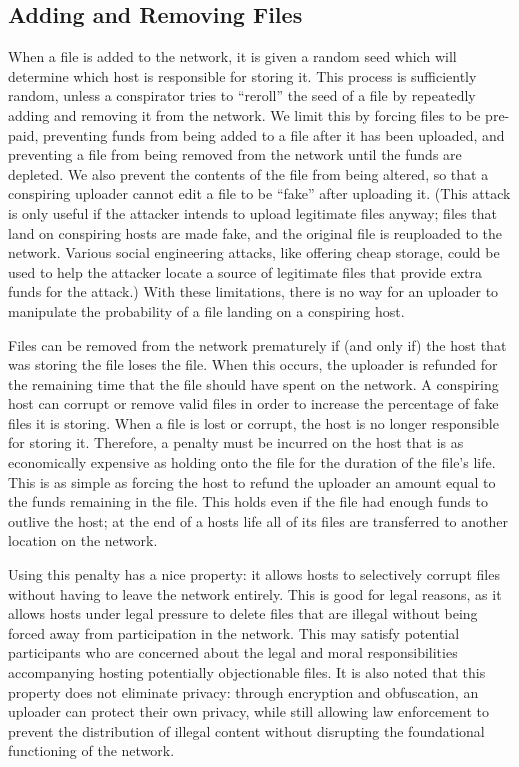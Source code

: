 \documentclass[twocolumn]{article}
\begin{document}
\subsection{Adding and Removing Files}
When a file is added to the network, it is given a random seed which will determine which host is responsible for storing it.
This process is sufficiently random, unless a conspirator tries to ``reroll'' the seed of a file by repeatedly adding and removing it from the network.
We limit this by forcing files to be pre-paid, preventing funds from being added to a file after it has been uploaded, and preventing a file from being removed from the network until the funds are depleted.
We also prevent the contents of the file from being altered, so that a conspiring uploader cannot edit a file to be ``fake'' after uploading it.
(This attack is only useful if the attacker intends to upload legitimate files anyway; files that land on conspiring hosts are made fake, and the original file is reuploaded to the network. Various social engineering attacks, like offering cheap storage, could be used to help the attacker locate a source of legitimate files that provide extra funds for the attack.)
With these limitations, there is no way for an uploader to manipulate the probability of a file landing on a conspiring host.

Files can be removed from the network prematurely if (and only if) the host that was storing the file loses the file.
When this occurs, the uploader is refunded for the remaining time that the file should have spent on the network.
A conspiring host can corrupt or remove valid files in order to increase the percentage of fake files it is storing.
When a file is lost or corrupt, the host is no longer responsible for storing it.
Therefore, a penalty must be incurred on the host that is as economically expensive as holding onto the file for the duration of the file's life.
This is as simple as forcing the host to refund the uploader an amount equal to the funds remaining in the file.
This holds even if the file had enough funds to outlive the host; at the end of a hosts life all of its files are transferred to another location on the network.

Using this penalty has a nice property: it allows hosts to selectively corrupt files without having to leave the network entirely.
This is good for legal reasons, as it allows hosts under legal pressure to delete files that are illegal without being forced away from participation in the network.
This may satisfy potential participants who are concerned about the legal and moral responsibilities accompanying hosting potentially objectionable files.
It is also noted that this property does not eliminate privacy: through encryption and obfuscation, an uploader can protect their own privacy, while still allowing law enforcement to prevent the distribution of illegal content without disrupting the foundational functioning of the network.
\end{document}
